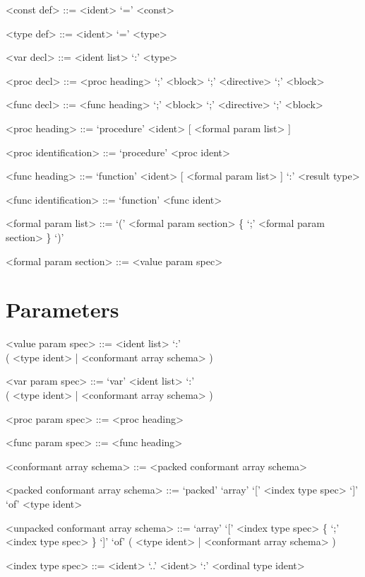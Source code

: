 \documentclass{article}
\begin{document}
{
  \begin{grammar}
    <const def> ::= <ident> `=' <const>

    <type def> ::= <ident> `=' <type>

    <var decl> ::= <ident list> `:' <type>

    <proc decl> ::= <proc heading> `;' <block>  `;' <directive>  `;' <block>

    <func decl> ::= <func heading> `;' <block>  `;' <directive>  `;' <block>

    <proc heading> ::= `procedure' <ident> [ <formal param list> ]
    
    <proc identification> ::= `procedure' <proc ident>

    <func heading> ::= `function' <ident> [ <formal param list> ] `:' <result type>
    
    <func identification> ::= `function' <func ident>

    <formal param list> ::= `(' <formal param section>
    \{ `;' <formal param section> \} `)'

    <formal param section> ::= <value param spec>   
  \end{grammar}
}

\section{Parameters}

{
  \begin{grammar}
    <value param spec> ::= <ident list> `:' \\
    ( <type ident> | <conformant array schema> )

    <var param spec> ::= `var' <ident list> `:' \\
    ( <type ident> | <conformant array schema> )

    <proc param spec> ::= <proc heading>

    <func param spec> ::= <func heading>

    <conformant array schema> ::= <packed conformant array schema> 

    <packed conformant array schema> ::= `packed' `array' `[' <index type spec> `]' `of' <type ident>

    <unpacked conformant array schema> ::= `array' `[' <index type spec> \{ `;' <index type spec> \} `]' `of' ( <type ident> | <conformant array schema> )

    <index type spec> ::= <ident> `..' <ident> `:' <ordinal type ident>
  \end{grammar}
}
\end{document}

